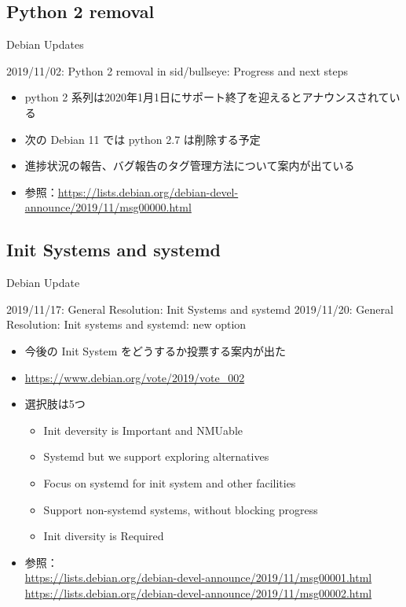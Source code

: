\documentclass[mingoth,a4paper]{jsarticle}
\begin{document}
\subsection{Python 2 removal}

{Debian Updates}%

2019/11/02: Python 2 removal in sid/bullseye: Progress and next steps
  
\begin{itemize}
\item python 2 系列は2020年1月1日にサポート終了を迎えるとアナウンスされている
\item 次の Debian 11 では python 2.7 は削除する予定
\item 進捗状況の報告、バグ報告のタグ管理方法について案内が出ている
\item 参照：\url{https://lists.debian.org/debian-devel-announce/2019/11/msg00000.html}
\end{itemize}




\subsection{Init Systems and systemd}

{Debian Update}%

2019/11/17: General Resolution: Init Systems and systemd
2019/11/20: General Resolution: Init systems and systemd: new option

\begin{itemize}
\item 今後の Init System をどうするか投票する案内が出た
\item \url{https://www.debian.org/vote/2019/vote_002}
\item 選択肢は5つ
  \begin{itemize}
  \item Init deversity is Important and NMUable
  \item Systemd but we support exploring alternatives
  \item Focus on systemd for init system and other facilities
  \item Support non-systemd systems, without blocking progress
  \item Init diversity is Required
  \end{itemize}
\item 参照：\\
  \url{https://lists.debian.org/debian-devel-announce/2019/11/msg00001.html} \\
  \url{https://lists.debian.org/debian-devel-announce/2019/11/msg00002.html}
\end{itemize}
\end{document}
